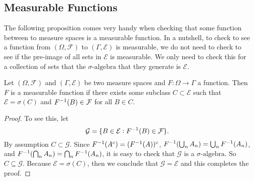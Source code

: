 \subsection{Measurable Functions}

The following proposition comes very handy when checking that some function between to measure spaces is a measurable function. In a nutshell, to check to see a function from $ (\Omega, \mathcal{F}) $ to $ (\Gamma, \mathcal{E}) $ is measurable, we do not need to check to see if the pre-image of all sets in $ \mathcal{E} $ is measurable. We only need to check this for a collection of sets that the $\sigma\text{-algebra}$ that they generate is $ \mathcal{E} $.

\begin{proposition}
	Let $ (\Omega, \mathcal{F}) $ and $ (\Gamma, \mathcal{E}) $ be two measure spaces and $ F: \Omega \to \Gamma $ a function. Then $ F $ is a measurable function if there exists some subclass $ C \subset \mathcal{E} $ such that $ \mathcal{E} = \sigma(C) $ and $ F^{-1}(B) \in \mathcal{F} $ for all $ B \in  C $.
\end{proposition}
\begin{proof}
	To see this, let 
	\[ \mathcal{G} = \{B \in \mathcal{E}: F^{-1}(B) \in \mathcal{F}\}. \]
	By assumption $ C \subset \mathcal{G} $. Since $ F^{-1}(A^c) = (F^{-1}(A))^c $, $ F^{-1}(\bigcup_n A_n) = \bigcup_n F^{-1}(A_n) $, and $ F^{-1}(\bigcap_n A_n) = \bigcap_n F^{-1}(A_n) $, it is easy to check that $ \mathcal{G} $ is a $\sigma\text{-algebra}$.  So $ C \subseteq \mathcal{G} $. Because $ \mathcal{E} = \sigma(C) $, then we conclude that $ \mathcal{G} = \mathcal{E} $ and this completes the proof.
\end{proof}


